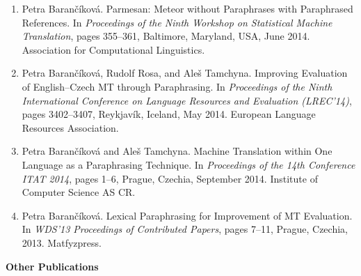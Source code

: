 \documentclass[12pt,a4paper]{report}
\begin{document}
\begin{enumerate}
    \item Petra Barančíková. Parmesan: Meteor without Paraphrases with Paraphrased References. In \emph{Proceedings of the Ninth Workshop on Statistical Machine Translation}, pages 355--361, Baltimore, Maryland, USA, June 2014. Association for Computational Linguistics.

    \item Petra Barančíková, Rudolf Rosa, and Aleš Tamchyna. Improving Evaluation of English--Czech MT through Paraphrasing. In \emph{Proceedings of the Ninth International Conference on Language Resources and Evaluation (LREC'14)}, pages 3402--3407, Reykjavík, Iceland, May 2014. European Language Resources Association.

    \item Petra Barančíková and Aleš Tamchyna. Machine Translation within One Language as a Paraphrasing Technique. In \emph{Proceedings of the 14th Conference ITAT 2014}, pages 1--6, Prague, Czechia, September 2014. Institute of Computer Science AS CR.

    \item Petra Barančíková. Lexical Paraphrasing for Improvement of MT Evaluation. In \emph{WDS'13 Proceedings of Contributed Papers}, pages 7--11, Prague, Czechia, 2013. Matfyzpress.
\end{enumerate}

\textbf{Other Publications}
\end{document}
